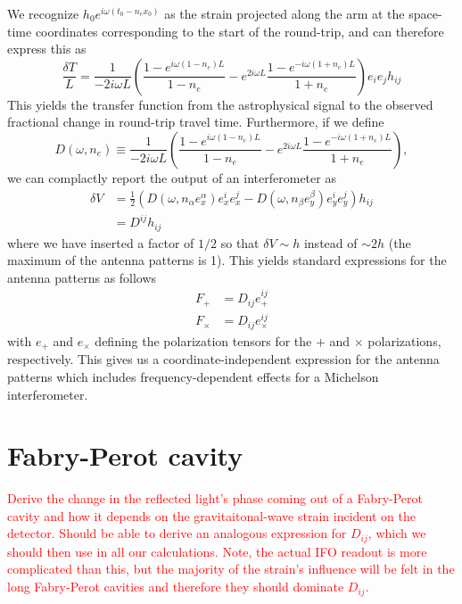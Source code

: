 \documentclass{article}
\begin{document}
We recognize $h_0 e^{i\omega(t_0-n_ex_0)}$ as the strain projected along the arm at the space-time coordinates corresponding to the start of the round-trip, and can therefore express this as
\begin{equation}
    \frac{\delta T}{L} = \frac{1}{-2i\omega L} \left(\frac{1-e^{i\omega(1-n_e)L}}{1-n_e} - e^{2i\omega L}\frac{1-e^{-i\omega(1+n_e)L}}{1+n_e} \right) e_i e_j h_{ij}
\end{equation}
This yields the transfer function from the astrophysical signal to the observed fractional change in round-trip travel time. 
Furthermore, if we define
\begin{equation}
    D(\omega, n_e) \equiv \frac{1}{-2i\omega L} \left(\frac{1-e^{i\omega(1-n_e)L}}{1-n_e} - e^{2i\omega L}\frac{1-e^{-i\omega(1+n_e)L}}{1+n_e} \right),
\end{equation}
we can complactly report the output of an interferometer as
\begin{align}
    \delta V & = \frac{1}{2}\left( D(\omega, n_\alpha e_x^\alpha) e_x^i e_x^j - D(\omega, n_\beta e_y^\beta) e_y^i e_y^j \right) h_{ij} \\
             & = D^{ij} h_{ij}
\end{align}
where we have inserted a factor of $1/2$ so that $\delta V\sim h$ instead of $\sim 2h$ (the maximum of the antenna patterns is 1).
This yields standard expressions for the antenna patterns as follows
\begin{align}
    F_+ & = D_{ij} e_+^{ij} \\
    F_\times & = D_{ij} e_\times^{ij}
\end{align}
with $e_+$ and $e_\times$ defining the polarization tensors for the $+$ and $\times$ polarizations, respectively.
This gives us a coordinate-independent expression for the antenna patterns which includes frequency-dependent effects for a Michelson interferometer.

\section*{Fabry-Perot cavity}

\textcolor{red}{
Derive the change in the reflected light's phase coming out of a Fabry-Perot cavity and how it depends on the gravitaitonal-wave strain incident on the detector.
Should be able to derive an analogous expression for $D_{ij}$, which we should then use in all our calculations.
Note, the actual IFO readout is more complicated than this, but the majority of the strain's influence will be felt in the long Fabry-Perot cavities and therefore they should dominate $D_{ij}$.
}


\end{document}
